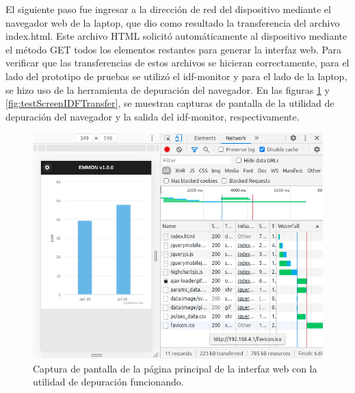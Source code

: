 El siguiente paso fue ingresar a la dirección de red del dispositivo mediante el navegador web de la laptop, que dio como resultado la transferencia del archivo index.html. Este archivo HTML solicitó automáticamente al dispositivo mediante el método GET todos los elementos restantes para generar la interfaz web. Para verificar que las transferencias de estos archivos se hicieran correctamente, para el lado del prototipo de pruebas se utilizó el idf-monitor y para el lado de la laptop, se hizo uso de la herramienta de depuración del navegador. En las figuras \ref{fig:testScreenBrowserDebug} y \ref{fig:testScreenIDFTransfer}, se muestran capturas de pantalla de la utilidad de depuración del navegador y la salida del idf-monitor, respectivamente.

\begin{figure}[ht]
	\centering
	\includegraphics[scale=0.5]{./Figures/test_interface_chrome_ap.png}
	\caption{Captura de pantalla de la página principal de la interfaz web con la utilidad de depuración funcionando.}
	\label{fig:testScreenBrowserDebug}
\end{figure}

